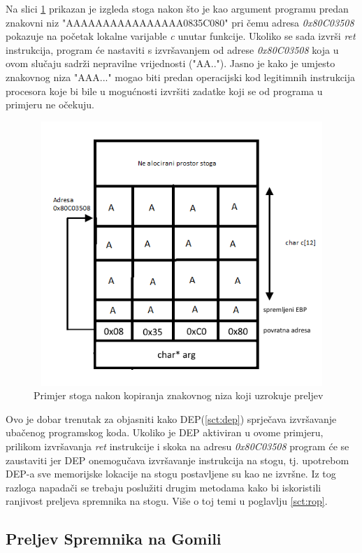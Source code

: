 \documentclass[times, utf8, diplomski, numeric]{fer}
\begin{document}
Na slici \ref{fig:buff_overflow_overflow} prikazan je izgleda
stoga nakon što je kao argument programu predan znakovni niz
"AAAAAAAAAAAAAAAA0835C080" pri čemu adresa \emph{0x80C03508}
pokazuje na početak lokalne varijable \emph{c} unutar funkcije.
Ukoliko se sada izvrši \emph{ret} instrukcija, program će
nastaviti s izvršavanjem od adrese \emph{0x80C03508} koja u ovom
slučaju sadrži nepravilne vrijednosti ("AA.."). Jasno je kako je
umjesto znakovnog niza "AAA..." mogao biti predan operacijski kod
legitimnih instrukcija procesora koje bi bile u mogućnosti
izvršiti zadatke koji se od programa u primjeru ne očekuju.

\begin{figure}[!ht]
\centering
\setlength\fboxsep{0pt}
\setlength\fboxrule{0.5pt}
\includegraphics[width=12cm, height=10cm]{slike/buffer_overflow_overflow}
\caption{Primjer stoga nakon kopiranja znakovnog niza koji uzrokuje preljev}
\label{fig:buff_overflow_overflow} 
\end{figure}

Ovo je dobar trenutak za objasniti kako DEP(\ref{sct:dep})
sprječava izvršavanje ubačenog programskog koda. Ukoliko je DEP
aktiviran u ovome primjeru, prilikom izvršavanja \emph{ret}
instrukcije i skoka na adresu \emph{0x80C03508} program će se
zaustaviti jer DEP onemogučava izvršavanje instrukcija na stogu,
tj. upotrebom DEP-a sve memorijske lokacije na stogu postavljene
su kao ne izvršne. Iz tog razloga napadači se trebaju poslužiti
drugim metodama kako bi iskoristili ranjivost preljeva spremnika
na stogu. Više o toj temi u poglavlju \ref{sct:rop}.

\subsection{Preljev Spremnika na Gomili}
\label{scr:heap_overflow}
\end{document}
